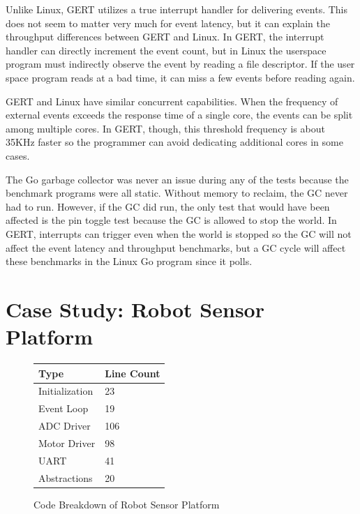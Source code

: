 Unlike Linux, GERT utilizes a true interrupt handler for delivering events.
This does not seem to matter very much for event latency, but it can explain
the throughput differences between GERT and Linux. In GERT, the interrupt handler
can directly increment the event count, but in Linux the userspace program
must indirectly observe the event by reading a file descriptor. If the user space
program reads at a bad time, it can miss a few events before reading again.


GERT and Linux have similar concurrent capabilities. When the frequency of external
events exceeds the response time of a single core, the events can be split among
multiple cores. In GERT, though, this threshold frequency is about 35KHz faster
so the programmer can avoid dedicating additional cores in some cases.

The Go garbage collector was never an issue during any of the tests because the
benchmark programs were all static. Without memory to reclaim, the GC never
had to run. However, if the GC did run, the only test that would have been affected is
the pin toggle test because the GC is allowed to stop the world. In GERT, interrupts
can trigger even when the world is stopped so the GC will not affect the event latency
and throughput benchmarks, but a GC cycle will affect these benchmarks in the Linux Go
program since it polls.

\section{Case Study: Robot Sensor Platform} \label{sec:robot}

\begin{figure}[h]
\begin{center}
  \begin{tabular}{ | l | l |}
    \hline
    Type & Line Count \\ \hline
    Initialization & 23 \\ \hline
    Event Loop & 19 \\ \hline
    ADC Driver & 106 \\ \hline
    Motor Driver & 98 \\ \hline
    UART & 41 \\ \hline
    Abstractions & 20 \\
    \hline
  \end{tabular}
\end{center}
  \caption{Code Breakdown of Robot Sensor Platform} \label{fig:robot_code}
\end{figure}


